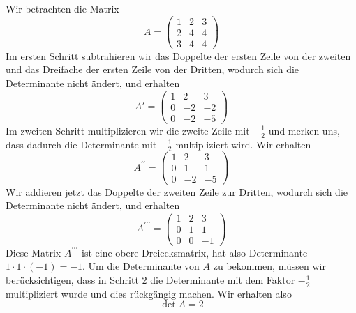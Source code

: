 \begin{beispiel}\label{det_n_einfach} Wir betrachten die Matrix 
  	$$ A = \left( \begin{matrix} 1 & 2 & 3 \\ 2 & 4 & 4 \\ 3 & 4 & 4 
    	\end{matrix} \right) $$
Im ersten Schritt subtrahieren wir das Doppelte der ersten Zeile von der zweiten und 
das Dreifache der ersten Zeile von der Dritten, 
wodurch sich die Determinante nicht ändert, und erhalten 
  	$$ A' = \left( \begin{matrix} 1 & 2 & 3 \\ 0 & -2 & -2 \\ 0 & -2 & -5 
   	\end{matrix} \right) $$
Im zweiten Schritt multiplizieren wir die zweite Zeile mit $-\frac{1}{2}$ und 
merken uns, dass dadurch die Determinante mit $-\frac{1}{2}$ multipliziert wird. 
Wir erhalten 
  	$$ A^{\prime \prime} = \left( \begin{matrix} 1 & 2 & 3 \\ 0 & 1 & 1 \\ 0 & -2 & -5 
   	\end{matrix} \right) $$
Wir addieren jetzt das Doppelte der zweiten Zeile zur Dritten,
wodurch sich die Determinante nicht ändert, und erhalten 
  	$$ A^{\prime \prime \prime} = \left( \begin{matrix} 1 & 2 & 3 \\ 0 & 1 & 1 
   	\\ 0 & 0 & -1  \end{matrix} \right) $$
Diese Matrix $A^{\prime \prime \prime}$ ist eine obere Dreiecksmatrix, hat also 
Determinante $1 \cdot 1 \cdot (-1) = -1$. Um die Determinante von $A$ zu bekommen, 
müssen wir berücksichtigen, dass in Schritt 2 die Determinante mit dem Faktor 
$-\frac{1}{2}$ multipliziert wurde und dies rückgängig machen. Wir erhalten also
  	$$ \det{A} = 2 $$
\end{beispiel}
 
